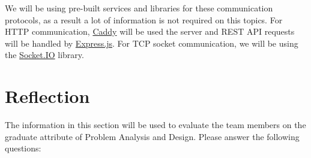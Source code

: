 \documentclass[12pt, titlepage]{article}
\begin{document}
	We will be using pre-built services and libraries for these communication protocols, as a result a lot of information is not required on this topics. For HTTP communication, \href{https://caddyserver.com/docs/}{Caddy} will be used the server and REST API requests will be handled by \href{https://expressjs.com/en/guide/routing.html}{Express.js}. For TCP socket communication, we will be using the \href{https://socket.io/docs/v4/server-api/}{Socket.IO} library.
	
	\section{Reflection}
	
	The information in this section will be used to evaluate the team members on the
	graduate attribute of Problem Analysis and Design.  Please answer the following questions:
	
\end{document}
